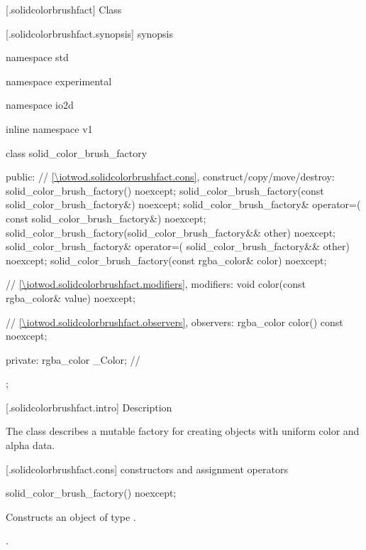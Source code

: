  [\iotwod.solidcolorbrushfact] {Class }

 [\iotwod.solidcolorbrushfact.synopsis] { synopsis}

\begin{codeblock}
namespace std { namespace experimental { namespace io2d { inline namespace v1 {
  class solid_color_brush_factory {
  public:
    // \ref{\iotwod.solidcolorbrushfact.cons}, construct/copy/move/destroy:
    solid_color_brush_factory() noexcept;
    solid_color_brush_factory(const solid_color_brush_factory&) noexcept;
    solid_color_brush_factory& operator=(
      const solid_color_brush_factory&) noexcept;
    solid_color_brush_factory(solid_color_brush_factory&& other) noexcept;
    solid_color_brush_factory& operator=(
      solid_color_brush_factory&& other) noexcept;
    solid_color_brush_factory(const rgba_color& color) noexcept;

    // \ref{\iotwod.solidcolorbrushfact.modifiers}, modifiers:
    void color(const rgba_color& value) noexcept;

    // \ref{\iotwod.solidcolorbrushfact.observers}, observers:
    rgba_color color() const noexcept;
    
  private:
    rgba_color _Color;      // \expos
  };
} } } }
\end{codeblock}

 [\iotwod.solidcolorbrushfact.intro] { Description}

\pnum
{}
The class  describes a mutable factory for creating  objects with uniform color and alpha data.

 [\iotwod.solidcolorbrushfact.cons] { constructors and assignment operators}

\begin{itemdecl}
    solid_color_brush_factory() noexcept;
\end{itemdecl}
\begin{itemdescr}
	\pnum
	\effects
	Constructs an object of type .
	
	\pnum
	\postcondition
	.
	
\end{itemdescr}

